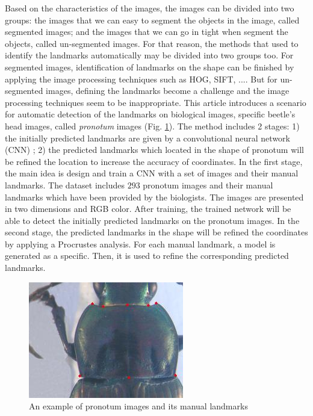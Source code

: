 \documentclass[10pt]{article}
\begin{document}
Based on the characteristics of the images, the images can be divided into two groups: the images that we can easy to segment the objects in the image, called segmented images; and the images that we can go in tight when segment the objects, called un-segmented images. For that reason, the methods that used to identify the landmarks automatically may be divided into two groups too. For segmented images, identification of landmarks on the shape can be finished by applying the image processing techniques such as HOG\cite{palaniswamy2010automatic}, SIFT\cite{lowe2004distinctive}, .... But for un-segmented images, defining the landmarks become a challenge and the image processing techniques seem to be inappropriate. This article introduces a scenario for automatic detection of the landmarks on biological images, specific beetle's head images, called \textit{pronotum} images (Fig. \ref{figpronotum}). The method includes 2 stages: 1) the initially predicted landmarks are given by a convolutional neural network (CNN) \cite{lecun2010convolutional}; 2) the predicted landmarks which located in the shape of pronotum will be refined the location to increase the accuracy of coordinates. In the first stage, the main idea is design and train a CNN with a set of images and their manual landmarks. The dataset includes $293$ pronotum images and their manual landmarks which have been provided by the biologists. The images are presented in two dimensions and RGB color. After training, the trained network will be able to detect the initially predicted landmarks on the pronotum images. In the second stage, the predicted landmarks in the shape will be refined the coordinates by applying a Procrustes analysis\cite{gower1975generalized}. For each manual landmark, a model is generated as a specific. Then, it is used to refine the corresponding predicted landmarks.

\begin{figure}[htbp]
\centering
	\centerline{\includegraphics[scale=0.65]{images/pronotum}}
	\caption{An example of pronotum images and its manual landmarks}
	\label{figpronotum}
\end{figure}
\end{document}
